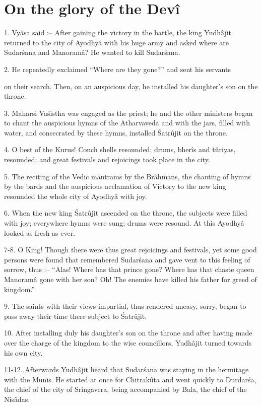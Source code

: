 ﻿\chapter{On the glory of the Dev\^i}

1. Vy\^asa said :-- After gaining the victory in the battle, the king Yudh\^ajit returned to the city of Ayodhy\^a with his huge army and asked where are Sudar\'sana and Manoram\^a? He wanted to kill Sudar\'sana.

2. He repeatedly exclaimed ``Where are they gone?'' and sent his servants

on their search. Then, on an auspicious day, he installed his daughter's son on the throne.

3. Maharsi Va\'sistha was engaged as the priest; he and the other ministers began to chant the auspicious hymns of the Atharvaveda and with the jars, filled with water, and consecrated by these hymns, installed \'Satrûjit on the throne.

4. O best of the Kurus! Conch shells resounded; drums, bher\^is and tûriyas, resounded; and great festivals and rejoicings took place in the city.

5. The reciting of the Vedic mantrams by the Br\^ahmans, the chanting of hymns by the bards and the auspicious acclamation of Victory to the new king resounded the whole city of Ayodhy\^a with joy.

6. When the new king \'Satrûjit ascended on the throne, the subjects were filled with joy; everywhere hymns were sung; drums were resound. At this Ayodhy\^a looked as fresh as ever.

7-8. O King! Though there were thus great rejoicings and festivals, yet some good persons were found that remembered Sudar\'sana and gave vent to this feeling of sorrow, thus :-- ``Alas! Where has that prince gone? Where has that chaste queen Manoram\^a gone with her son? Oh! The enemies have killed his father for greed of kingdom.''

9. The saints with their views impartial, thus rendered uneasy, sorry, began to pass away their time there subject to \'Satrûjit.

10. After installing duly his daughter's son on the throne and after having made over the charge of the kingdom to the wise councillors, Yudh\^ajit turned towards his own city.

11-12. Afterwards Yudh\^ajit heard that Sudar\'sana was staying in the hermitage with the Munis. He started at once for Chitrakûta and went quickly to Durdar\'sa, the chief of the city of Sringavera, being accompanied by Bala, the chief of the N\^is\^adas.

